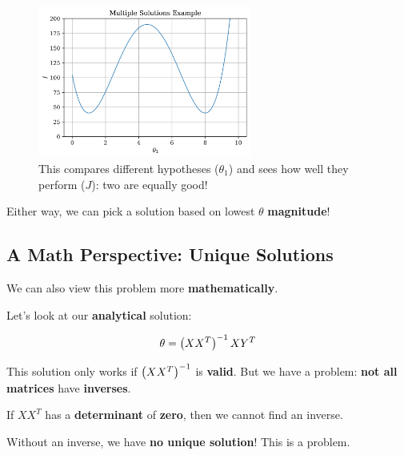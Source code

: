         \begin{figure}[H]
        \centering
            \includegraphics[width=70mm,scale=0.5]{images/regression_images/Regression_Multiple_Solutions_Example.png}
        
            \caption*{This compares different hypotheses ($\theta_1$) and sees how well they perform ($J$): two are equally good!}
        \end{figure}
        
        Either way, we can pick a solution based on lowest $\theta$ \textbf{magnitude}!
        
    \subsection{A Math Perspective: Unique Solutions}    
        
        We can also view this problem more \textbf{mathematically}.
        
        Let's look at our \textbf{analytical} solution:
        
        \begin{equation}
            \theta = 
                 \left(  XX^T  \right)  ^{-1}   X Y^T
        \end{equation}
        
        This solution only works if $ \left(  XX^T  \right)  ^{-1}$ is \textbf{valid}. But we have a problem: \textbf{not all matrices} have \textbf{inverses}. 
        
        If $XX^T$ has a \textbf{determinant} of \textbf{zero}, then we cannot find an inverse. 
        
        Without an inverse, we have \textbf{no unique solution}! This is a problem.
        
